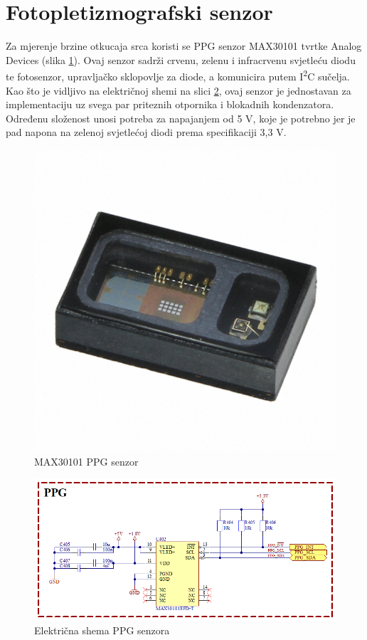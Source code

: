 \newpage
\section{Fotopletizmografski senzor}

Za mjerenje brzine otkucaja srca koristi se PPG senzor MAX30101 tvrtke Analog Devices (slika \ref{slk:MAX30101}). Ovaj senzor sadrži crvenu, zelenu i infracrvenu svjetleću diodu te fotosenzor, upravljačko sklopovlje za diode, a komunicira putem I\textsuperscript{2}C sučelja. Kao što je vidljivo na električnoj shemi na slici \ref{slk:PPG}, ovaj senzor je jednostavan za implementaciju uz svega par priteznih otpornika i blokadnih kondenzatora. Određenu složenost unosi potreba za napajanjem od 5 V, koje je potrebno jer je pad napona na zelenoj svjetlećoj diodi prema specifikaciji 3,3 V.
\begin{figure}[htb]
    \centering
    \includegraphics[width=6 cm]{Figures/MAX30101.JPG}
    \caption{MAX30101 PPG senzor \cite{DigiKey}}
    \label{slk:MAX30101}
\end{figure}
\begin{figure}[htb]
    \centering
    \includegraphics[width=\textwidth]{Figures/PPG.png}
    \caption{Električna shema PPG senzora}
    \label{slk:PPG}
\end{figure}

